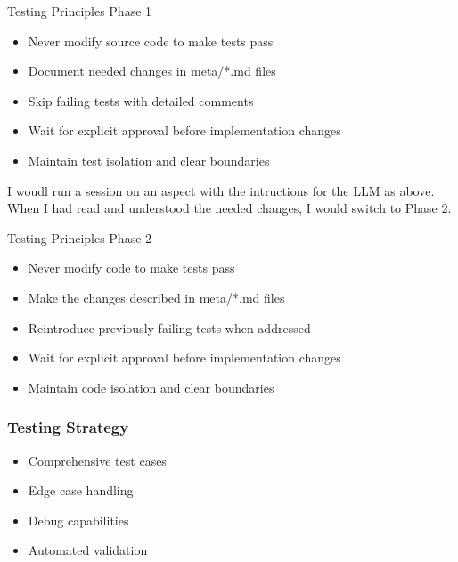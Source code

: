 \documentclass{beamer}
\begin{document}
    \begin{frame}  
    \begin{block}{Testing Principles Phase 1}
        \begin{itemize}
            \item Never modify source code to make tests pass
            \item Document needed changes in meta/*.md files
            \item Skip failing tests with detailed comments
            \item Wait for explicit approval before implementation changes
            \item Maintain test isolation and clear boundaries
        \end{itemize}
    \end{block}
I woudl run a session on an aspect with the intructions for the LLM as above. When I had read and understood the needed changes, I would switch to Phase 2.
\end{frame}

\begin{frame}  
\begin{block}{Testing Principles Phase 2}
    \begin{itemize}
        \item Never modify code to make tests pass
        \item Make the changes described in meta/*.md files
        \item Reintroduce previously failing tests when addressed 
        \item Wait for explicit approval before implementation changes
        \item Maintain code isolation and clear boundaries
    \end{itemize}
\end{block}
\end{frame}



\begin{frame}
    \frametitle{Testing Strategy}
    \begin{itemize}
        \item Comprehensive test cases
        \item Edge case handling
        \item Debug capabilities
        \item Automated validation
    \end{itemize}
\end{frame}
\end{document}

